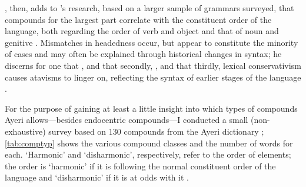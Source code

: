 \citet{gaeta2008}, then, adds to \citet{bauer2001}'s research, based on a 
larger sample of grammars surveyed, that compounds for the largest part 
correlate with the constituent order of the language, both regarding the order 
of verb and object and that of noun and genitive \citep[129--133]{gaeta2008}. 
Mismatches in headedness occur, but appear to constitute the minority of cases 
and may often be explained through historical changes in syntax; he discerns  
for one that , and that secondly, , and that 
thirdly, lexical conservativism causes atavisms to linger on, reflecting the 
syntax of earlier stages of the language \citep[138--139]{gaeta2008}.

For the purpose of gaining at least a little insight into which types of 
compounds Ayeri allows---besides endocentric compounds---I conducted a small 
(non-exhaustive) survey based on 130 compounds from the Ayeri dictionary 
\citep[Dictionary]{benung}; \autoref{tab:comptyp} shows the various compound 
classes and the number of words for each. `Harmonic' and `disharmonic', 
respectively, refer to the order of elements; the order is `harmonic' 
if it is following the normal constituent order of the language and 
`disharmonic' if it is at odds with it \citep{gaeta2008}.

